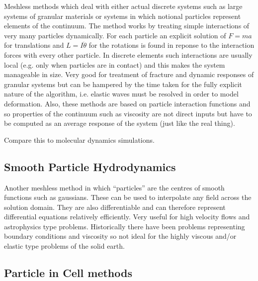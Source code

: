 \documentclass[10pt]{article}
\begin{document}
		Meshless methods which deal with either actual discrete systems such as
		large systems of granular materials or systems in which notional particles represent
		elements of the continuum.  The method works by treating simple interactions of
		very many particles dynamically. For each particle an explicit solution of $F=ma$ for 
		translations and $L=I\ddot{\theta}$ for the rotations is found in reponse
		to the interaction forces with every other particle. In discrete elements such interactions
		are usually local (e.g. only when particles are in contact) and this makes the system
		manageable in size.  Very good for treatment of fracture and dynamic responses of 
		granular systems but can be hampered by the time taken for the fully explicit nature of the algorithm, i.e. 
		elastic waves must be resolved in order to  model deformation. Also, these methods
		are based on particle interaction functions and so properties of the continuum such 
		as viscosity are not direct inputs but have to be computed as an average response of
		the system (just like the real thing).
		
		Compare this to molecular dynamics simulations.
	
	\subsection{Smooth Particle Hydrodynamics}
	
		Another meshless method in which  ``particles'' are the centres of
		smooth functions such as gaussians. These can be used to interpolate
		any field across the solution domain. They are also differentiable and
		can therefore represent differential equations relatively efficiently.
		Very useful for high velocity flows and astrophysics type problems. 
		Historically there have been problems representing boundary conditions
		and viscosity so not ideal for the highly viscous and/or elastic type problems
		of the solid earth.
		
	\subsection{Particle in Cell methods}	
	
\end{document}
